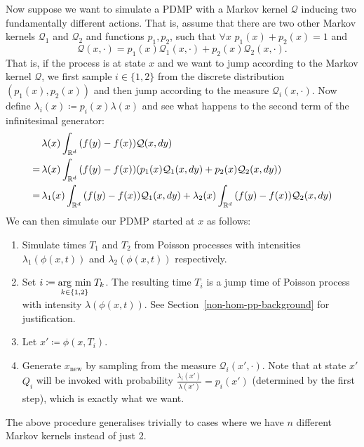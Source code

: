\documentclass[report.tex]{subfiles}
\begin{document}
Now suppose we want to simulate a PDMP with a Markov kernel $\mathcal{Q}$ inducing
two fundamentally different actions. That is, assume that there are two other
Markov kernels $\mathcal{Q}_{1}$ and $\mathcal{Q}_{2}$ and functions $p_{1}, p_{2}$,
such that $\forall x\,\, p_{1}(x) + p_{2}(x) = 1$ and
$$
  \mathcal{Q}(x, \cdot) = p_{1}(x)\mathcal{Q}_{1}(x, \cdot) + p_{2}(x)\mathcal{Q}_{2}(x, \cdot).
$$
That is, if the process is at state $x$ and we want to jump according to the
Markov kernel $\mathcal{Q}$, we first sample $i \in \{1, 2\}$ from the discrete distribution
$(p_{1}(x), p_{2}(x))$ and then jump according to the measure $\mathcal{Q}_{i}(x, \cdot)$.
Now define $\lambda_{i}(x) \coloneqq p_{i}(x) \lambda(x)$ and see what happens to the
second term of the infinitesimal generator:
\begin{align*}
   &\lambda(x)\int_{{\mathbb{R}^{d}}}^{{}} {}{(f(y) - f(x))\mathcal{Q}(x, dy)} \\
  =\,&\lambda(x)\int_{{\mathbb{R}^{d}}}^{{}} {}{(f(y) - f(x))(p_{1}(x)\mathcal{Q}_{1}(x, dy)+p_{2}(x)\mathcal{Q}_{2}(x, dy))}\\
  =\,&\lambda_{1}(x)\int_{{\mathbb{R}^{d}}}^{{}} {}{(f(y) - f(x))\mathcal{Q}_{1}(x, dy)}
    + \lambda_{2}(x)\int_{{\mathbb{R}^{d}}}^{{}} {}{(f(y) - f(x))\mathcal{Q}_{2}(x, dy)} \\
\end{align*}
We can then simulate our PDMP started at $x$ as follows:
\begin{enumerate}
\item Simulate times $T_{1}$ and $T_{2}$ from Poisson processes with intensities
      $\lambda_{1}(\phi(x, t))$ and $\lambda_{2}(\phi(x, t))$ respectively.
\item Set $i \coloneqq \underset{k \in \{1, 2\}}{\operatorname{arg}\,\operatorname{min}}\; T_{k}$. The resulting time $T_{i}$
      is a jump time of Poisson process with intensity $\lambda(\phi(x, t))$.
      See Section~\ref{non-hom-pp-background} for justification.
\item Let $x' \coloneqq \phi(x, T_{i}).$
\item Generate $x_{\text{new}}$ by sampling from the measure $\mathcal{Q}_{i}(x', \cdot)$.
      Note that at state $x'$ $Q_{i}$ will be invoked with probability
      $\frac{\lambda_{i}(x')}{\lambda(x')} = p_{i}(x')$
      (determined by the first step), which is exactly what we want.
\end{enumerate}
The above procedure generalises trivially to cases where we have $n$ different Markov kernels
instead of just 2.
\end{document}
